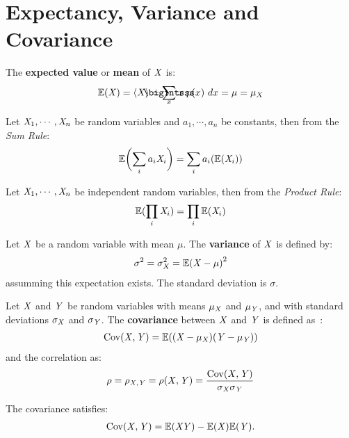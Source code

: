 \section{Expectancy, Variance and Covariance}
\begin{definition}
	The \textbf{expected value} or \textbf{mean} of \({\mathit{X}}\) is:
	\begin{align}
		\E (\rvX)=\langle \rvX \rangle = \SumInt_x \rx~p(\rx)~dx = \mu = \mu_X
	\end{align}
\end{definition}
\begin{theorem}
	Let \({\mathit{X}}_1, \cdots, {\mathit{X}}_n\) be random variables and \(a_1, \cdots, a_n\) be constants, then from the \emph{Sum Rule}:
	\begin{align}
		\mathbb{E} \biggl(\sum_i a_i{\mathit{X}}_i\biggr)=\sum_i a_i(\mathbb{E} ({\mathit{X}}_i))
	\end{align}
\end{theorem}
\begin{theorem}
	Let \({\mathit{X}}_1, \cdots, {\mathit{X}}_n\) be independent random variables, then from the \emph{Product Rule}:
	\begin{align}
		\mathbb{E} (\prod_i {\mathit{X}}_i)=\prod_i \mathbb{E} ({\mathit{X}}_i)
	\end{align}
\end{theorem}
\begin{definition}
	Let \({\mathit{X}}\) be a random variable with mean \(\mu\). The \textbf{variance} of \({\mathit{X}}\) is defined by:
	\begin{align}
		\sigma^2 = \sigma_{{\mathit{X}}}^2 =\mathbb{E} {({\mathit{X}} - \mu)}^2
	\end{align}
	assumming this expectation exists. The standard deviation is \(\sigma\).
\end{definition}
\begin{definition}
	Let \({{\mathit{X}}}\) and \({{\mathit{Y}}}\) be random variables with means \(\mu_{{\mathit{X}}}\) and \(\mu_{{\mathit{Y}}}\), and with standard deviations \(\sigma_{{\mathit{X}}}\) and \(\sigma_{{\mathit{Y}}}\). The \textbf{covariance} between \({{\mathit{X}}}\) and \({{\mathit{Y}}}\) is defined as~\cite[p.74]{wasserman:2013}:
	\begin{align}
		\operatorname{Cov}({{\mathit{X}}},{{\mathit{Y}}}) = \mathbb{E} (({{\mathit{X}}} - \mu_{{\mathit{X}}})({{\mathit{Y}}} - \mu_{{\mathit{Y}}}))
	\end{align}
	and the correlation as:
	\begin{align}
		\rho = \rho_{{{\mathit{X}}},{{\mathit{Y}}}} = \rho({{\mathit{X}}},{{\mathit{Y}}}) = \frac{\operatorname{Cov}({{\mathit{X}}},{{\mathit{Y}}})}{\sigma_{{\mathit{X}}} \sigma_{{\mathit{Y}}}}
	\end{align}
\end{definition}
\begin{theorem}
	The covariance satisfies:
	\begin{align}
		\operatorname{Cov}({{\mathit{X}}},{{\mathit{Y}}})=\mathbb{E} ({{\mathit{X}}}{{\mathit{Y}}})- \mathbb{E}({{\mathit{X}}}) \mathbb{E}({{\mathit{Y}}}).
	\end{align}
\end{theorem}


